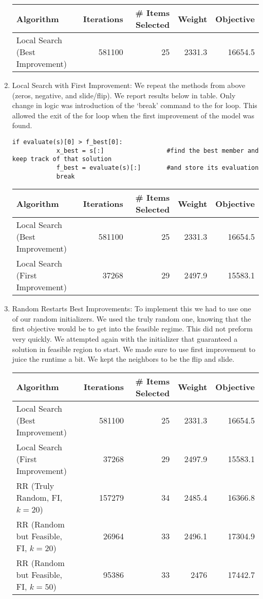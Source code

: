 \documentclass[11pt]{article}
\begin{document}
\begin{enumerate}
\begin{tabular}{lrrrr}
Algorithm&Iterations&\# Items Selected&Weight&Objective\\ \hline
Local Search (Best Improvement)&581100&25&2331.3&16654.5\\ \hline
\end{tabular}
\item Local Search with First Improvement:  We repeat the methods from above (zeros, negative, and slide/flip).  We report results below in table.  Only change in logic was introduction of the `break' command to the for loop.  This allowed the exit of the for loop when the first improvement of the model was found. 
\begin{verbatim}
if evaluate(s)[0] > f_best[0]:
            x_best = s[:]                 #find the best member and keep track of that solution
            f_best = evaluate(s)[:]       #and store its evaluation
            break
\end{verbatim}
\begin{tabular}{lrrrr}
Algorithm&Iterations&\# Items Selected&Weight&Objective\\ \hline
Local Search (Best Improvement)&581100&25&2331.3&16654.5\\ 
Local Search (First Improvement)&37268&29&2497.9&15583.1\\
\hline
\end{tabular}
\item Random Restarts Best Improvements:  To implement this we had to use one of our random initializers. We used the truly random one, knowing that the first objective would be to get into the feasible regime.  This did not preform very quickly.  We attempted again with the initializer that guaranteed a solution in feasible region to start.  We made sure to use first improvement to juice the runtime a bit. We kept the neighbors to be the flip and slide. 

\begin{tabular}{lrrrr}
Algorithm&Iterations&\# Items Selected&Weight&Objective\\ \hline
Local Search (Best Improvement)&581100&25&2331.3&16654.5\\ 
Local Search (First Improvement)&37268&29&2497.9&15583.1\\
RR (Truly Random, FI, $k=20$) & 157279&34&2485.4&16366.8\\
RR (Random but Feasible, FI, $k = 20$)& 26964&33&2496.1&17304.9\\
RR (Random but Feasible, FI, $k = 50$)& 95386&33&2476&17442.7\\
\hline
\end{tabular}


\end{enumerate}
\end{document}

